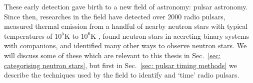 These early detection gave birth to a new field of astronomy: pulsar astronomy.
Since then, researches in the field have detected over 2000 radio pulsars, measured thermal
emission from a handful of nearby neutron stars with typical temperatures of
$10^{5}$K to $10^{6}$K \citep{pavlov2003thermal}, found neutron stars in
accreting binary systems with companions, and identified many other ways to
observe neutron stars. We will discuss some of these which are relevant to this
thesis in Sec.~\ref{sec: categorising neutron stars}, but first in
Sec.~\ref{sec: pulsar timing methods} we describe the techniques used by the
field to identify and `time' radio pulsars.
